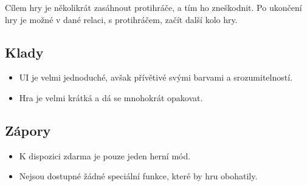 Cílem hry je několikrát zasáhnout protihráče, a tím ho zneškodnit.
Po ukončení hry je možné v dané relaci, s protihráčem, začít další kolo hry.

\subsection*{Klady}

\begin{itemize}
    \item UI je velmi jednoduché, avšak přívětivé svými barvami a srozumitelností.
    \item Hra je velmi krátká a dá se mnohokrát opakovat.
\end{itemize}

\subsection*{Zápory}

\begin{itemize}
    \item K dispozici zdarma je pouze jeden herní mód.
    \item Nejsou dostupné žádné speciální funkce, které by hru obohatily.
\end{itemize}
